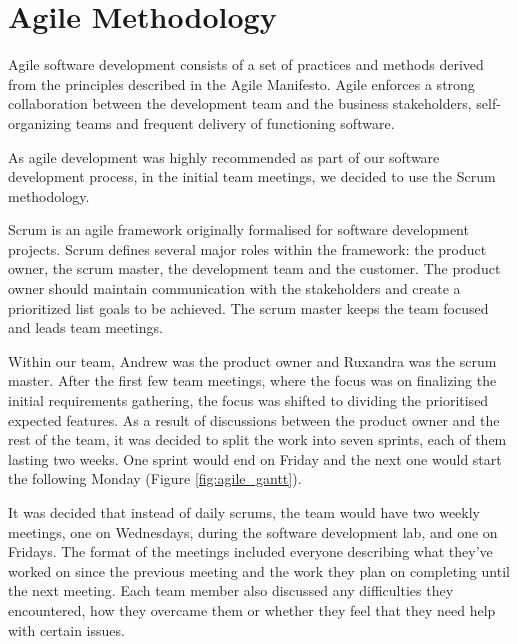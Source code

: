 \documentclass{l3proj}
\begin{document}
\section{Agile Methodology} %
\label{sec:agile}


Agile software development consists of a set of practices and methods derived
 from the principles described in the Agile Manifesto. Agile enforces a strong
 collaboration between the development team and the business stakeholders,
 self-organizing teams and frequent delivery of functioning
 software\cite{agile_overview}.

As agile development was highly recommended as part of our software development
 process, in the initial team meetings, we decided to use the Scrum
 methodology.

 Scrum is an agile framework originally formalised for software development
 projects. Scrum defines several major roles within the framework: the product
 owner, the scrum master, the development team and the customer. The product 
 owner should maintain communication with the stakeholders and create a prioritized 
 list goals to be achieved. The scrum master keeps the team focused and leads team 
 meetings.\cite{scrum_overview}

 Within our team, Andrew was the product owner and Ruxandra was the scrum master.
  After the first few team meetings, where the focus was on finalizing the initial
  requirements gathering, the focus was shifted to dividing the prioritised
  expected features. As a result of discussions between the product owner and
  the rest of the team, it was decided to split the work into seven sprints,
  each of them lasting two weeks. One sprint would end on Friday and the next
  one would start the following Monday (Figure \ref{fig:agile_gantt}).


 It was decided that instead of daily scrums, the team would have two weekly
  meetings, one on Wednesdays, during the software development lab, and one on
  Fridays. The format of the meetings included everyone describing what they've
  worked on since the previous meeting and the work they plan on completing
  until the next meeting. Each team member also discussed any difficulties
  they encountered, how they overcame them or whether they feel that they
  need help with certain issues.
\end{document}
